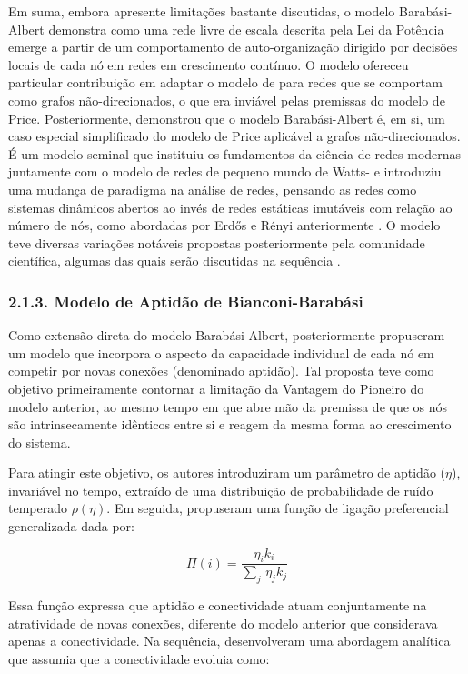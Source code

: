 \documentclass[12pt,oneside,a4paper,brazil,sumario=tradicional]{abntex2}
\begin{document}
Em suma, embora apresente limitações bastante discutidas, o modelo Barabási-Albert demonstra como uma rede livre de escala descrita pela Lei da Potência emerge a partir de um comportamento de auto-organização dirigido por decisões locais de cada nó em redes em crescimento contínuo. O modelo ofereceu particular contribuição em adaptar o modelo de  para redes que se comportam como grafos não-direcionados, o que era inviável pelas premissas do modelo de Price. Posteriormente,  demonstrou que  o modelo Barabási-Albert é, em si, um caso especial simplificado do modelo de Price aplicável a grafos não-direcionados. É um modelo seminal que instituiu os fundamentos da ciência de redes modernas juntamente com o modelo de redes de pequeno mundo de Watts- e introduziu uma mudança de paradigma na análise de redes, pensando as redes como sistemas dinâmicos abertos ao invés de redes estáticas imutáveis com relação ao número de nós, como abordadas por Erdős e Rényi anteriormente \cite{latora2017}. O modelo teve diversas variações notáveis propostas posteriormente pela comunidade científica, algumas das quais serão discutidas na sequência .

\subsubsection*{2.1.3. Modelo de Aptidão de Bianconi-Barabási}
Como extensão direta do modelo Barabási-Albert, posteriormente  propuseram um modelo que incorpora o aspecto da capacidade individual de cada nó em competir por novas conexões (denominado aptidão). Tal proposta teve como objetivo primeiramente contornar a limitação da Vantagem do Pioneiro do modelo anterior, ao mesmo tempo em que abre mão da premissa de que os nós são intrinsecamente idênticos entre si e reagem da mesma forma ao crescimento do sistema.

Para atingir este objetivo, os autores introduziram um parâmetro de aptidão ($\eta$), invariável no tempo, extraído de uma distribuição de probabilidade de ruído temperado $\rho(\eta)$. Em seguida, propuseram uma função de ligação preferencial generalizada dada por:

\[\Pi(i) = \frac{\eta_{i}k_{i}}{\sum_{j}\,\eta_{j}k_{j}}\]

Essa função expressa que aptidão e conectividade atuam conjuntamente na atratividade de novas conexões, diferente do modelo anterior que considerava apenas a conectividade. Na sequência, desenvolveram uma abordagem analítica que assumia que a conectividade evoluia como:
\end{document}
